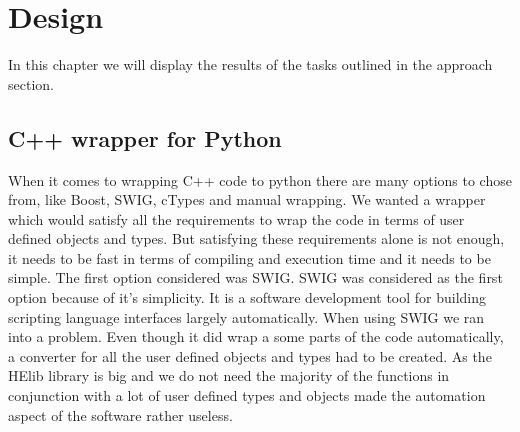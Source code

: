 

\afterpage{\blankpage}   %

\chapter{Design}
In this chapter we will display the results of the tasks outlined in the approach section.

\section{C++ wrapper for Python}
When it comes to wrapping C++ code to python there are many options to chose from, like Boost, SWIG, cTypes and manual wrapping. We wanted a wrapper which would satisfy all the requirements to wrap the code in terms of user defined objects and types. But satisfying these requirements alone is not enough, it needs to be fast in terms of compiling and execution time and it needs to be simple. The first option considered was SWIG. SWIG was considered as the first option because of it's simplicity. It is a software development tool for building scripting language interfaces largely automatically. When using SWIG we ran into a problem. Even though it did wrap a some parts of the code automatically, a converter for all the user defined objects and types had to be created. As the HElib library is big and we do not need the majority of the functions in conjunction with a lot of user defined types and objects made the automation aspect of the software rather useless.\\\\
